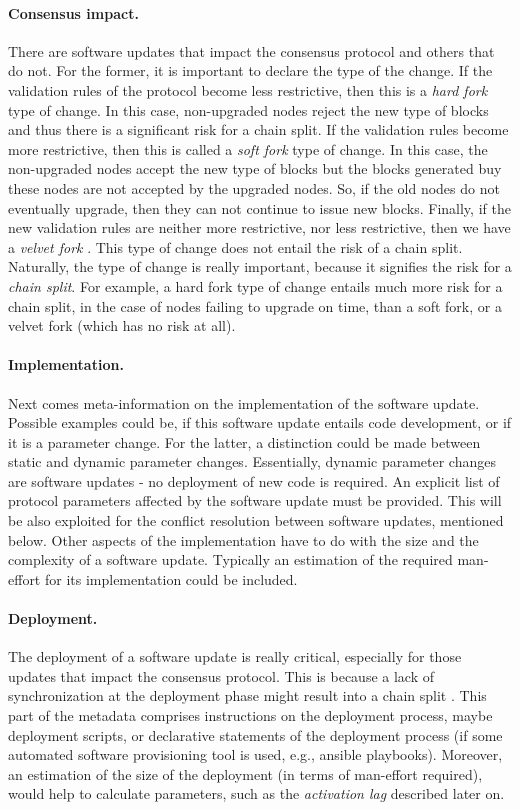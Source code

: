 \paragraph{Consensus impact.} There are software updates that impact the consensus protocol and others that do not. For the former, it is important to declare the type of the change. If the validation rules of the protocol become less restrictive, then this is a \emph{hard fork} type of change. In this case, non-upgraded nodes reject the new type of blocks and thus there is a significant risk for a chain split. If the validation rules become more restrictive, then this is called a \emph{soft fork} type of change. In this case, the non-upgraded nodes accept the new type of blocks but the blocks generated buy these nodes are not accepted by the upgraded nodes. So, if the old nodes do not eventually upgrade, then they can not continue to issue new blocks. Finally, if the new validation rules are neither more restrictive, nor less restrictive, then we have a \emph{velvet fork} \cite{velvet}. This type of change does not entail the risk of a chain split. Naturally, the type of change is really important, because it signifies the risk for a \emph{chain split}. For example, a hard fork type of change entails much more risk for a chain split, in the case of nodes failing to upgrade on time, than a soft fork, or a velvet fork (which has no risk at all).
\paragraph{Implementation.} Next comes meta-information on the implementation of the software update. Possible examples could be, if this software update entails code development, or if it is a parameter change. For the latter, a distinction could be made between static and dynamic parameter changes. Essentially, dynamic parameter changes are  software updates - no deployment of new code is required. An explicit list of protocol parameters affected by the software update must be provided. This will be also exploited for the conflict resolution between software updates, mentioned below. Other aspects of the implementation have to do with the size and the complexity of a software update. Typically an estimation of the required man-effort for its implementation could be included.
\paragraph{Deployment.} The deployment of a software update is really critical, especially for those updates that impact the consensus protocol. This is because a lack of synchronization at the deployment phase might result into a chain split . This part of the metadata comprises instructions on the deployment process, maybe deployment scripts, or declarative statements of the deployment process (if some automated software provisioning tool is used, e.g., ansible playbooks). Moreover, an estimation of the size of the deployment (in terms of man-effort required), would help to calculate parameters, such as the \emph{activation lag} described later on.
